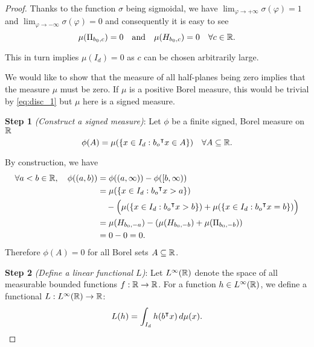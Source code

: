 \begin{proof}
    Thanks to the function $\sigma$ being sigmoidal, we have $\lim_{\varphi\to
    +\infty} \sigma(\varphi)= 1$ and $\lim_{\varphi\to -\infty}
    \sigma(\varphi)=0$ and consequently it is easy to see
    \begin{equation}
        \label{eq:disc_1}
        \mu(\Pi_{b_0, c}) = 0 \quad \text{and} \quad \mu (H_{b_0, c}) = 0 
        \quad \forall c\in\mathbb{R}.
    \end{equation}

    This in turn implies $\mu(I_d) = 0$ as $c$ can be chosen arbitrarily large.
    
    We would like to show that the measure of all half-planes being zero implies
    that the measure $\mu$ must be zero. If $\mu$ is a positive Borel measure,
    this would be trivial by \eqref{eq:disc_1} but $\mu$ here is a signed
    measure.
    
    \textbf{Step 1} \textit{(Construct a signed measure)}: Let $\phi$ be a
    finite signed, Borel measure on $\mathbb{R}$
    \begin{equation}
        \label{eq:disc_2}
        \phi(A) = \mu(\{x \in I_d: b_o{}^{\intercal} x \in A\}) \quad \forall A \subseteq \mathbb{R}.
    \end{equation}

    By construction, we have
    \begin{align}
        \forall a < b \in \mathbb{R}, \quad \phi((a,b)) 
        &= \phi((a,\infty)) - \phi([b, \infty)) \\
        &= \mu(\{x \in I_d: b_o{}^{\intercal} x > a\}) \\
        &\quad- \Big(
            \mu(\{x \in I_d: b_o{}^{\intercal} x > b\})
            + \mu(\{x \in I_d: b_o{}^{\intercal} x = b\})
        \Big) \\
        &= \mu(H_{b_0, -a}) - (\mu(H_{b_0, -b}) + \mu(\Pi_{b_0, -b})) \\
        &= 0 - 0 = 0.
    \end{align}
    Therefore $\phi(A) = 0$ for all Borel sets $A \subseteq \mathbb{R}$.

    \textbf{Step 2} \textit{(Define a linear functional $L$)}: Let
    $L^{\infty}(\mathbb{R})$ denote the space of all measurable bounded functions $f:
    \mathbb{R} \to \mathbb{R}$. For a function $h \in L^{\infty}(\mathbb{R})$, we define a functional
    $L: L^{\infty}(\mathbb{R}) \to \mathbb{R}$:
    \begin{equation}
        L(h) = \int_{I_d} h(b{}^{\intercal} x)\,d\mu(x).
    \end{equation}


\end{proof}
